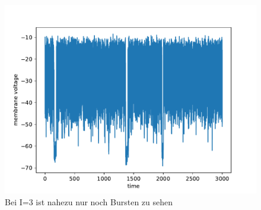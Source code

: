 \documentclass[12pt,a4paper]{article}
\begin{document}
\begin{figure}[H]
	\centering
	\includegraphics[scale=0.9]{inapi3d5.pdf} 
	\caption{Bei I=3 ist nahezu nur noch Bursten zu sehen}
	\label{i3d5}
\end{figure}
\end{document}
